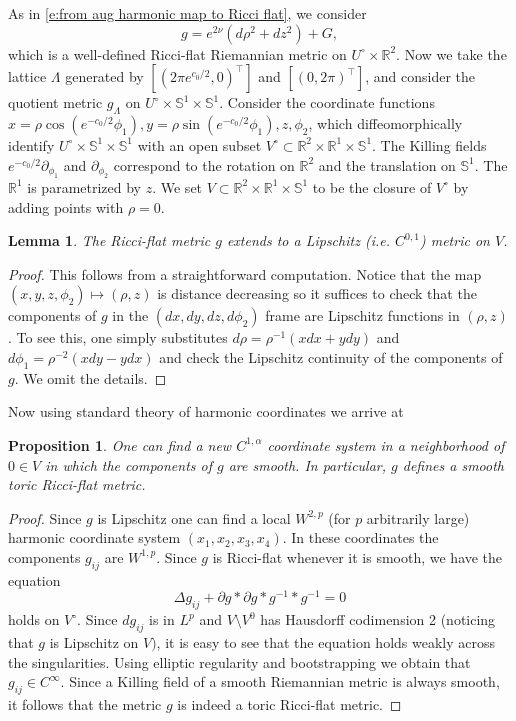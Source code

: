 \documentclass[a4paper,11pt]{amsart}
\newtheorem{lemma}[theorem]{Lemma}
\newtheorem{proposition}[theorem]{Proposition}
\theoremstyle{definition}
\numberwithin{equation}{section}
\newcommand{\p}{\partial}
\newcommand{\dS}{\mathbb{S}}
\begin{document}
As in \eqref{e:from aug harmonic map to Ricci flat},  we consider $$g=e^{2\nu}(d\rho^2+dz^2)+G,$$ which is a well-defined Ricci-flat Riemannian metric on $U^\circ\times\mathbb{R}^2$. 
 Now we take the lattice $\Lambda$ generated by $[(2\pi e^{c_0/2}, 0)^{\top}]$ and $[(0, 2\pi)^{\top}]$, and consider the quotient metric $g_\Lambda$ on $U^\circ\times \dS^1\times \dS^1$. Consider the coordinate functions $x=\rho\cos(e^{-c_0/2}\phi_1),y=\rho\sin( e^{-c_0/2}\phi_1),z,\phi_2$, which diffeomorphically identify $U^\circ\times \dS^1\times \dS^1$ with an open subset $V^\circ\subset\mathbb{R}^2\times\mathbb{R}^1\times \dS^1$. The Killing fields $e^{-c_0/2}\partial_{\phi_1}$ and $\partial_{\phi_2}$ correspond to the rotation on $\mathbb{R}^2$ and the translation on  $\dS^1$. The $\mathbb{R}^1$ is parametrized by $z$.  We set $V\subset\mathbb{R}^2\times\mathbb{R}^1\times \dS^1$ to be the closure of $V^\circ$ by adding points with $\rho=0$. 



\begin{lemma}\label{lem:Lipschitz metric}
	The Ricci-flat metric $g$ extends to a Lipschitz (i.e. $C^{0, 1}$) metric on $V$.
\end{lemma}
\begin{proof}
	This follows from a straightforward computation. Notice that the map $(x, y, z, \phi_2)\mapsto (\rho, z)$ is distance decreasing so it suffices to check that the components of $g$ in the $(dx, dy, dz, d\phi_2)$ frame are Lipschitz functions in $(\rho, z)$. To see this, one simply substitutes $d\rho=\rho^{-1}(xdx+ydy)$ and $d\phi_1=\rho^{-2}(xdy-ydx)$ and check the Lipschitz continuity of the components of $g$. We omit the details. 
\end{proof}

Now using standard theory of harmonic coordinates we arrive at 
\begin{proposition}\label{p:rod smooth compactification}
	One can find a new $C^{1, \alpha}$ coordinate system in a neighborhood of $0\in V$ in which the components of $g$ are smooth. In particular, $g$ defines a smooth toric  Ricci-flat metric.
\end{proposition}
\begin{proof}
Since $g$ is Lipschitz one can find a local $W^{2, p}$ (for $p$ arbitrarily large) harmonic coordinate system $(x_1, x_2, x_3, x_4)$. In these coordinates the components $g_{ij}$ are $W^{1, p}$. Since $g$ is Ricci-flat whenever it is smooth, we have the equation 
$$\Delta g_{ij}+\p g*\p g*g^{-1}*g^{-1}=0$$
holds on $V^\circ$. Since $dg_{ij}$ is in $L^p$ and $V\setminus V^0$ has Hausdorff codimension 2 (noticing that $g$ is Lipschitz on $V)$, it is easy to see that the equation holds weakly across the singularities.
Using elliptic regularity and bootstrapping we obtain that $g_{ij}\in C^\infty$. Since  a Killing field of a smooth Riemannian metric is always smooth, it follows that the metric $g$ is indeed a toric Ricci-flat metric.
\end{proof}
\end{document}
